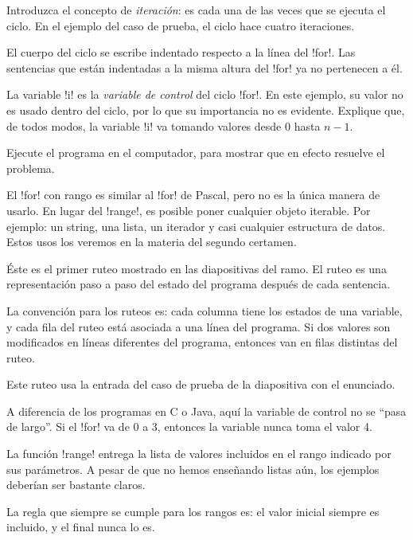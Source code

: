 \documentclass[10pt]{article}
\begin{document}
  Introduzca el concepto de \emph{iteración}:
  es cada una de las veces que se ejecuta el ciclo.
  En el ejemplo del caso de prueba,
  el ciclo hace cuatro iteraciones.

  El cuerpo del ciclo se escribe indentado
  respecto a la línea del \li!for!.
  Las sentencias que están indentadas a la misma altura del \li!for!
  ya no pertenecen a él.

  La variable \li!i! es la \emph{variable de control}
  del ciclo \li!for!. En este ejemplo,
  su valor no es usado dentro del ciclo,
  por lo que su importancia no es evidente.
  Explique que, de todos modos,
  la variable \li!i! va tomando valores desde 0 hasta \(n - 1\).

  Ejecute el programa en el computador,
  para mostrar que en efecto resuelve el problema.

  El \li!for! con rango es similar al \li!for! de Pascal,
  pero no es la única manera de usarlo.
  En lugar del \li!range!, es posible poner cualquier objeto iterable.
  Por ejemplo: un string, una lista, un iterador y casi cualquier estructura de datos.
  Estos usos los veremos en la materia del segundo certamen.


  Éste es el primer ruteo mostrado en las diapositivas del ramo.
  El ruteo es una representación paso a paso
  del estado del programa después de cada sentencia.

  La convención para los ruteos es:
  cada columna tiene los estados de una variable,
  y cada fila del ruteo está asociada a una línea del programa.
  Si dos valores son modificados en líneas diferentes del programa,
  entonces van en filas distintas del ruteo.

  Este ruteo usa la entrada del caso de prueba de la diapositiva con el enunciado.

  A diferencia de los programas en C o Java,
  aquí la variable de control no se ``pasa de largo''.
  Si el \li!for! va de 0 a 3, entonces la variable nunca toma el valor 4.


  La función \li!range! entrega la lista de valores incluidos en el rango
  indicado por sus parámetros.
  A pesar de que no hemos enseñando listas aún,
  los ejemplos deberían ser bastante claros.

  La regla que siempre se cumple para los rangos es:
  el valor inicial siempre es incluido,
  y el final nunca lo es.
\end{document}
